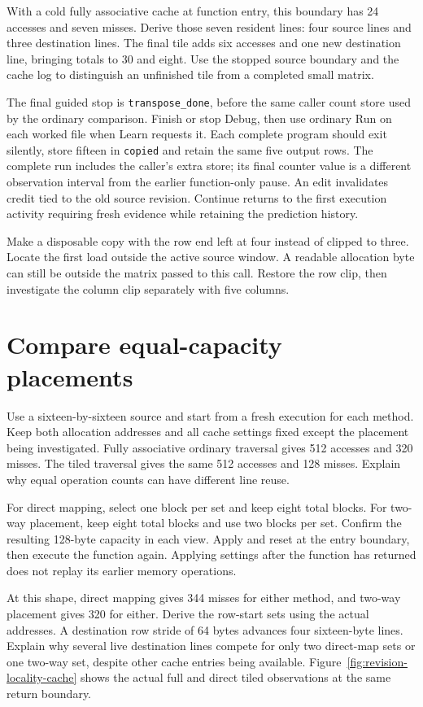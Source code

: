 With a cold fully associative cache at function entry, this boundary has 24 accesses
and seven misses. Derive those seven resident lines: four source lines and three
destination lines. The final tile adds six accesses and one new destination line,
bringing totals to 30 and eight. Use the stopped source boundary and the cache log
to distinguish an unfinished tile from a completed small matrix.

The final guided stop is \texttt{transpose\_done}, before the same caller
count store used by the ordinary comparison. Finish or stop Debug, then use
ordinary Run on each worked file when Learn requests it. Each complete program
should exit silently, store fifteen in \texttt{copied} and retain the same
five output rows. The complete run includes the caller's extra store; its
final counter value is a different observation interval from the earlier
function-only pause. An edit invalidates credit tied to the old source revision.
Continue returns to the first execution activity requiring fresh evidence while
retaining the prediction history.

Make a disposable copy with the row end left at four instead of clipped to three.
Locate the first load outside the active source window. A readable allocation byte
can still be outside the matrix passed to this call. Restore the row clip, then
investigate the column clip separately with five columns.

\section{Compare equal-capacity placements}

Use a sixteen-by-sixteen source and start from a fresh execution for each method.
Keep both allocation addresses and all cache settings fixed except the placement
being investigated. Fully associative ordinary traversal gives 512 accesses and
320 misses. The tiled traversal gives the same 512 accesses and 128 misses.
Explain why equal operation counts can have different line reuse.

For direct mapping, select one block per set and keep eight total blocks. For
two-way placement, keep eight total blocks and use two blocks per set. Confirm
the resulting 128-byte capacity in each view. Apply and reset at the entry boundary,
then execute the function again. Applying settings after the function has returned
does not replay its earlier memory operations.

At this shape, direct mapping gives 344 misses for either method, and two-way
placement gives 320 for either. Derive the row-start sets using the actual addresses.
A destination row stride of 64 bytes advances four sixteen-byte lines. Explain
why several live destination lines compete for only two direct-map sets or one
two-way set, despite other cache entries being available. Figure~\ref{fig:revision-locality-cache}
shows the actual full and direct tiled observations at the same return boundary.


